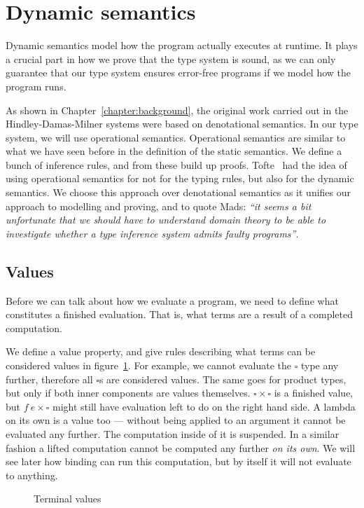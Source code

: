 \section{Dynamic semantics}
Dynamic semantics model how the program actually executes at
runtime. It plays a crucial part in how we prove that the type system
is sound, as we can only guarantee that our type system ensures
error-free programs if we model how the program runs.

As shown in Chapter~\ref{chapter:background}, the original work
carried out in the Hindley-Damas-Milner systems were based on
denotational semantics. In our type system, we will use operational
semantics. Operational semantics are similar to what we have seen
before in the definition of the static semantics. We define a bunch of
inference rules, and from these build up proofs. Tofte~\cite{tofte1988}
had the idea of using operational semantics for not for the
typing rules, but also for the dynamic semantics. We choose this
approach over denotational semantics as it unifies our approach to
modelling and proving, and to quote Mads: \textit{``it seems a bit
unfortunate that we should have to understand domain theory to be able
to investigate whether a type inference system admits faulty
programs''}.

\subsection{Values}
Before we can talk about how we evaluate a program, we need to
define what constitutes a finished evaluation. That is, what
terms are a result of a completed computation.

We define a value property, and give rules describing what terms can
be considered values in figure~\ref{fig:values}. For example, we
cannot evaluate the $\square$ type any further, therefore all $\square$s
are considered values. The same goes for product types, but only if
both inner components are values themselves. $\square \times \square$ is a
finished value, but $f \ e \times \square$ might still have evaluation left to
do on the right hand side.
A lambda on its own is a value too ---
without being applied to an argument it cannot be evaluated any
further. The computation inside of it is suspended.
In a similar fashion a lifted computation cannot be computed any
further \textit{on its own}. We will see later how binding can run
this computation, but by itself it will not evaluate to anything.

\begin{figure}
  \caption{Terminal values}\label{fig:values}
\end{figure}

